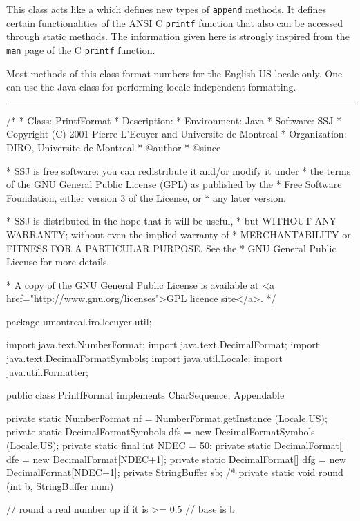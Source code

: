 
This class acts like a  which defines new types
of \texttt{append} methods.
It defines certain functionalities of the ANSI C \texttt{printf}
function that also can be accessed through static methods.
The information given here is strongly inspired
from the \texttt{man} page of the C \texttt{printf} function.

Most methods of this class format numbers for the English US
locale only. One can use the Java class 
for performing locale-independent formatting.

\bigskip\hrule

\begin{code}
\begin{hide}
/*
 * Class:        PrintfFormat
 * Description:
 * Environment:  Java
 * Software:     SSJ
 * Copyright (C) 2001  Pierre L'Ecuyer and Universite de Montreal
 * Organization: DIRO, Universite de Montreal
 * @author
 * @since

 * SSJ is free software: you can redistribute it and/or modify it under
 * the terms of the GNU General Public License (GPL) as published by the
 * Free Software Foundation, either version 3 of the License, or
 * any later version.

 * SSJ is distributed in the hope that it will be useful,
 * but WITHOUT ANY WARRANTY; without even the implied warranty of
 * MERCHANTABILITY or FITNESS FOR A PARTICULAR PURPOSE.  See the
 * GNU General Public License for more details.

 * A copy of the GNU General Public License is available at
   <a href="http://www.gnu.org/licenses">GPL licence site</a>.
 */
\end{hide}
package umontreal.iro.lecuyer.util; \begin{hide}

import java.text.NumberFormat;
import java.text.DecimalFormat;
import java.text.DecimalFormatSymbols;
import java.util.Locale;
import java.util.Formatter;
\end{hide}


public class PrintfFormat implements CharSequence, Appendable\begin{hide} {
   private static NumberFormat nf = NumberFormat.getInstance (Locale.US);
   private static DecimalFormatSymbols dfs =
       new DecimalFormatSymbols (Locale.US);
   private static final int NDEC = 50;
   private static DecimalFormat[] dfe = new DecimalFormat[NDEC+1];
   private static DecimalFormat[] dfg = new DecimalFormat[NDEC+1];
   private StringBuffer sb;
/*
   private static void round (int b, StringBuffer num) {
      // round a real number up if it is >= 0.5
      // base is b

}}
\end{hide}
\end{code}
